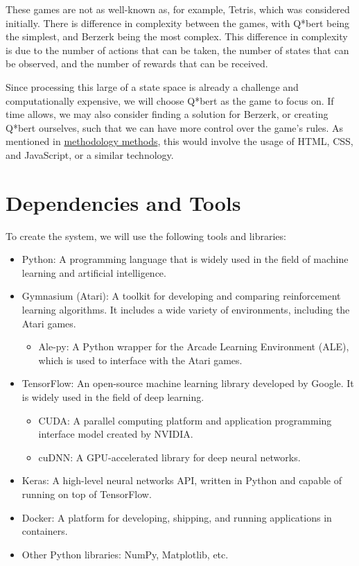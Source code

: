 These games are not as well-known as, for example, Tetris, which was
considered initially. There is difference in complexity between the games,
with Q*bert being the simplest, and Berzerk being the most complex. This
difference in complexity is due to the number of actions that can be taken,
the number of states that can be observed, and the number of rewards that can
be received.

Since processing this large of a state space is already a challenge and
computationally expensive, we will choose Q*bert as the game to focus on. If
time allows, we may also consider finding a solution for Berzerk, or creating
Q*bert ourselves, such that we can have more control over the game's rules. As
mentioned in \hyperref[sec:methodology-methods]{methodology methods}, this
would involve the usage of HTML, CSS, and JavaScript, or a similar technology.

\section{Dependencies and Tools}\label{sec:environment-setup-dependencies-tools}
To create the system, we will use the following tools and libraries:

\begin{itemize}
    \item Python: A programming language that is widely used in the field of
        machine learning and artificial intelligence.
    \item Gymnasium (Atari): A toolkit for developing and comparing
        reinforcement learning algorithms. It includes a wide variety of
        environments, including the Atari games.
        \begin{itemize}
            \item Ale-py: A Python wrapper for the Arcade Learning Environment
                (ALE), which is used to interface with the Atari games.
        \end{itemize}
    \item TensorFlow: An open-source machine learning library developed by
        Google. It is widely used in the field of deep learning.
        \begin{itemize}
            \item CUDA: A parallel computing platform and application
                programming interface model created by NVIDIA.
            \item cuDNN: A GPU-accelerated library for deep neural networks.
        \end{itemize}
    \item Keras: A high-level neural networks API, written in Python and
        capable of running on top of TensorFlow.
    \item Docker: A platform for developing, shipping, and running applications
        in containers.
    \item Other Python libraries: NumPy, Matplotlib, etc.
\end{itemize}

